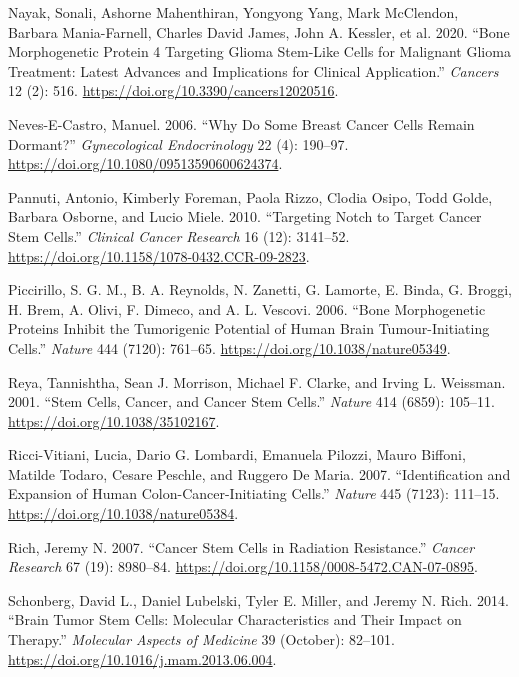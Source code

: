 \documentclass[
  letterpaper,
]{scrreprt}
\newlength{\cslhangindent}
\newenvironment{CSLReferences}[2] %
 {\begin{list}{}{%
  \setlength{\itemindent}{0pt}
  \setlength{\leftmargin}{0pt}
  \setlength{\parsep}{0pt}
  \ifodd #1
   \setlength{\leftmargin}{\cslhangindent}
   \setlength{\itemindent}{-1\cslhangindent}
  \fi
  \setlength{\itemsep}{#2\baselineskip}}}
 {\end{list}}
\theoremstyle{definition}
\theoremstyle{remark}
\begin{document}
\begin{CSLReferences}{1}{0}
Nayak, Sonali, Ashorne Mahenthiran, Yongyong Yang, Mark McClendon,
Barbara Mania-Farnell, Charles David James, John A. Kessler, et al.
2020. {``Bone Morphogenetic Protein 4 Targeting Glioma Stem-Like Cells
for Malignant Glioma Treatment: Latest Advances and Implications for
Clinical Application.''} \emph{Cancers} 12 (2): 516.
\url{https://doi.org/10.3390/cancers12020516}.

Neves-E-Castro, Manuel. 2006. {``Why Do Some Breast Cancer Cells Remain
Dormant?''} \emph{Gynecological Endocrinology} 22 (4): 190--97.
\url{https://doi.org/10.1080/09513590600624374}.

Pannuti, Antonio, Kimberly Foreman, Paola Rizzo, Clodia Osipo, Todd
Golde, Barbara Osborne, and Lucio Miele. 2010. {``Targeting Notch to
Target Cancer Stem Cells.''} \emph{Clinical Cancer Research} 16 (12):
3141--52. \url{https://doi.org/10.1158/1078-0432.CCR-09-2823}.

Piccirillo, S. G. M., B. A. Reynolds, N. Zanetti, G. Lamorte, E. Binda,
G. Broggi, H. Brem, A. Olivi, F. Dimeco, and A. L. Vescovi. 2006.
{``Bone Morphogenetic Proteins Inhibit the Tumorigenic Potential of
Human Brain Tumour-Initiating Cells.''} \emph{Nature} 444 (7120):
761--65. \url{https://doi.org/10.1038/nature05349}.

Reya, Tannishtha, Sean J. Morrison, Michael F. Clarke, and Irving L.
Weissman. 2001. {``Stem Cells, Cancer, and Cancer Stem Cells.''}
\emph{Nature} 414 (6859): 105--11.
\url{https://doi.org/10.1038/35102167}.

Ricci-Vitiani, Lucia, Dario G. Lombardi, Emanuela Pilozzi, Mauro
Biffoni, Matilde Todaro, Cesare Peschle, and Ruggero De Maria. 2007.
{``Identification and Expansion of Human Colon-Cancer-Initiating
Cells.''} \emph{Nature} 445 (7123): 111--15.
\url{https://doi.org/10.1038/nature05384}.

Rich, Jeremy N. 2007. {``Cancer Stem Cells in Radiation Resistance.''}
\emph{Cancer Research} 67 (19): 8980--84.
\url{https://doi.org/10.1158/0008-5472.CAN-07-0895}.

Schonberg, David L., Daniel Lubelski, Tyler E. Miller, and Jeremy N.
Rich. 2014. {``Brain Tumor Stem Cells: Molecular Characteristics and
Their Impact on Therapy.''} \emph{Molecular Aspects of Medicine} 39
(October): 82--101. \url{https://doi.org/10.1016/j.mam.2013.06.004}.


\end{CSLReferences}
\end{document}
